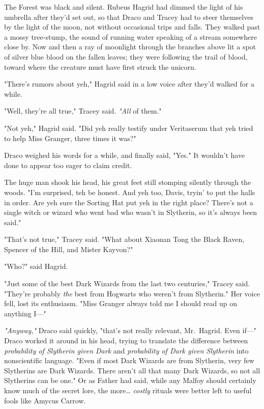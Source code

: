 The Forest was black and silent. Rubeus Hagrid had dimmed the light of his 
umbrella after they'd set out, so that Draco and Tracey had to steer themselves 
by the light of the moon, not without occasional trips and falls. They walked 
past a mossy tree-stump, the sound of running water speaking of a stream 
somewhere close by. Now and then a ray of moonlight through the branches above 
lit a spot of silver blue blood on the fallen leaves; they were following the 
trail of blood, toward where the creature must have first struck the unicorn.

"There's rumors about yeh," Hagrid said in a low voice after they'd walked for 
a while.

"Well, they're all true," Tracey said. \emph{"All} of them."

"Not yeh," Hagrid said. "Did yeh really testify under Veritaserum that yeh 
tried to help Miss Granger, three times it was?"

Draco weighed his words for a while, and finally said, "Yes." It wouldn't have 
done to appear too eager to claim credit.

The huge man shook his head, his great feet still stomping silently through the 
woods. "I'm surprised, teh be honest. And yeh too, Davis, tryin' to put the 
halls in order. Are yeh sure the Sorting Hat put yeh in the right place? 
There's not a single witch or wizard who went bad who wasn't in Slytherin, so 
it's always been said."

"That's not true," Tracey said. "What about Xiaonan Tong the Black Raven, 
Spencer of the Hill, and Mister Kayvon?"

"Who?" said Hagrid.

"Just some of the best Dark Wizards from the last two centuries," Tracey said. 
"They're probably \emph{the} best from Hogwarts who weren't from Slytherin." 
Her voice fell, lost its enthusiasm. "Miss Granger always told me I should read 
up on anything I---"

\emph{"Anyway,"} Draco said quickly, "that's not really relevant, Mr.~Hagrid. 
Even if---" Draco worked it around in his head, trying to translate the 
difference between \emph{probability of Slytherin given Dark} and 
\emph{probability of Dark given Slytherin} into nonscientific language. "Even 
if most Dark Wizards are from Slytherin, very few Slytherins are Dark Wizards. 
There aren't all that many Dark Wizards, so not all Slytherins can be one." Or 
as Father had said, while any Malfoy should certainly know much of the secret 
lore, the more{\ldots} \emph{costly} rituals were better left to useful fools 
like Amycus Carrow.

